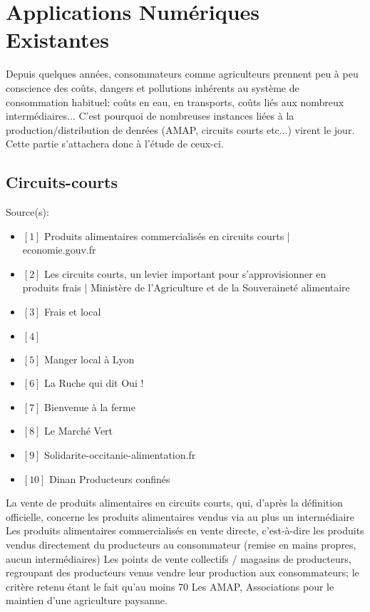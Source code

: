 \chapter*{Applications Numériques Existantes}

Depuis quelques années, consommateurs comme agriculteurs prennent peu à peu conscience des coûts, dangers et pollutions inhérents au système de consommation habituel: coûts en eau, en transports, coûts liés aux nombreux intermédiaires...
C'est pourquoi de nombreuses instances liées à la production/distribution de denrées (AMAP, circuits courts etc...) virent le jour. Cette partie s'attachera donc à l'étude de ceux-ci.



\section*{Circuits-courts}

Source(s): \begin{itemize}
	\item $[1]$ Produits alimentaires commercialisés en circuits courts | economie.gouv.fr
	\item $[2]$ Les circuits courts, un levier important pour s’approvisionner en produits frais | Ministère de l'Agriculture et de la Souveraineté alimentaire
	\item $[3]$ Frais et local
	\item $[4]$
	\item $[5]$ Manger local à Lyon
	\item $[6]$ La Ruche qui dit Oui !
	\item $[7]$ Bienvenue à la ferme
	\item $[8]$ Le Marché Vert
	\item $[9]$ Solidarite-occitanie-alimentation.fr
	\item $[10]$ Dinan Producteurs confinés
	\end{itemize}

La vente de produits alimentaires en circuits courts, qui, d’après la définition officielle, concerne les produits alimentaires vendus via au plus un intermédiaire
Les produits alimentaires commercialisés en vente directe, c’est-à-dire les produits vendus directement du producteurs au consommateur (remise en mains propres, aucun intermédiaires)
Les points de vente collectifs / magasins de producteurs, regroupant des producteurs venus vendre leur production aux consommateurs; le critère retenu étant le fait qu’au moins 70%
Les AMAP, Associations pour le maintien d’une agriculture paysanne.

